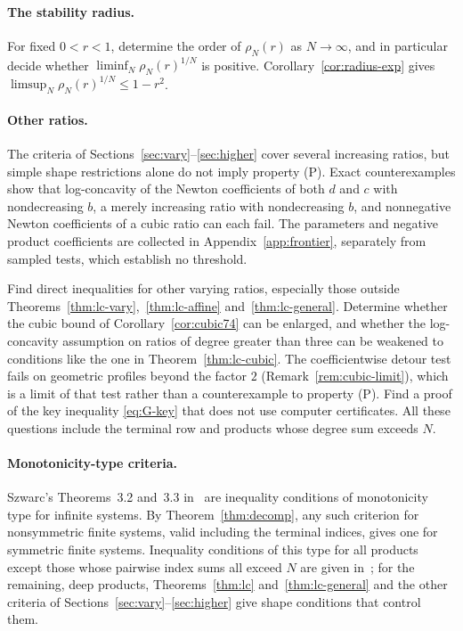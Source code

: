 \paragraph{The stability radius.} For fixed $0<r<1$, determine the order of $\rho_N(r)$ as $N\to\infty$, and in particular decide whether $\liminf_N\rho_N(r)^{1/N}$ is positive. Corollary~\ref{cor:radius-exp} gives $\limsup_N\rho_N(r)^{1/N}\leq1-r^2$.

\paragraph{Other ratios.} The criteria of Sections~\ref{sec:vary}--\ref{sec:higher} cover several increasing ratios, but simple shape restrictions alone do not imply property (P). Exact counterexamples show that log-concavity of the Newton coefficients of both $d$ and $c$ with nondecreasing $b$, a merely increasing ratio with nondecreasing $b$, and nonnegative Newton coefficients of a cubic ratio can each fail. The parameters and negative product coefficients are collected in Appendix~\ref{app:frontier}, separately from sampled tests, which establish no threshold.

Find direct inequalities for other varying ratios, especially those outside Theorems~\ref{thm:lc-vary},~\ref{thm:lc-affine} and~\ref{thm:lc-general}. Determine whether the cubic bound of Corollary~\ref{cor:cubic74} can be enlarged, and whether the log-concavity assumption on ratios of degree greater than three can be weakened to conditions like the one in Theorem~\ref{thm:lc-cubic}. The coefficientwise detour test fails on geometric profiles beyond the factor $2$ (Remark~\ref{rem:cubic-limit}), which is a limit of that test rather than a counterexample to property (P). Find a proof of the key inequality \eqref{eq:G-key} that does not use computer certificates. All these questions include the terminal row and products whose degree sum exceeds $N$.

\paragraph{Monotonicity-type criteria.} Szwarc's Theorems~3.2 and~3.3 in~\cite{szwarc} are inequality conditions of monotonicity type for infinite systems. By Theorem~\ref{thm:decomp}, any such criterion for nonsymmetric finite systems, valid including the terminal indices, gives one for symmetric finite systems. Inequality conditions of this type for all products except those whose pairwise index sums all exceed $N$ are given in~\cite{P3}; for the remaining, deep products, Theorems~\ref{thm:lc} and~\ref{thm:lc-general} and the other criteria of Sections~\ref{sec:vary}--\ref{sec:higher} give shape conditions that control them.

